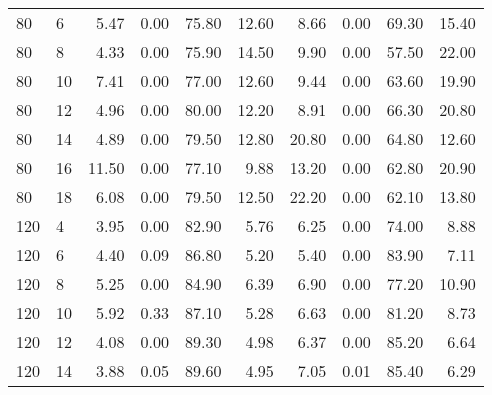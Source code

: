 \begin{table*}[h]
\begin{center}
\begin{tabular} {l l | r r r r | r r r r }
80   &             6   &  5.47   &            0.00             &               75.80  &  12.60  &  8.66   &            0.00             &               69.30  &  15.40  \\
80   &             8   &  4.33   &            0.00             &               75.90  &  14.50  &  9.90   &            0.00             &               57.50  &  22.00  \\
80   &             10  &  7.41   &            0.00             &               77.00  &  12.60  &  9.44   &            0.00             &               63.60  &  19.90  \\
80   &             12  &  4.96   &            0.00             &               80.00  &  12.20  &  8.91   &            0.00             &               66.30  &  20.80  \\
80   &             14  &  4.89   &            0.00             &               79.50  &  12.80  &  20.80  &            0.00             &               64.80  &  12.60  \\
80   &             16  &  11.50  &            0.00             &               77.10  &  9.88   &  13.20  &            0.00             &               62.80  &  20.90  \\
80   &             18  &  6.08   &            0.00             &               79.50  &  12.50  &  22.20  &            0.00             &               62.10  &  13.80  \\
120  &             4   &  3.95   &            0.00             &               82.90  &  5.76   &  6.25   &            0.00             &               74.00  &  8.88   \\
120  &             6   &  4.40   &            0.09             &               86.80  &  5.20   &  5.40   &            0.00             &               83.90  &  7.11   \\
120  &             8   &  5.25   &            0.00             &               84.90  &  6.39   &  6.90   &            0.00             &               77.20  &  10.90  \\
120  &             10  &  5.92   &            0.33             &               87.10  &  5.28   &  6.63   &            0.00             &               81.20  &  8.73   \\
120  &             12  &  4.08   &            0.00             &               89.30  &  4.98   &  6.37   &            0.00             &               85.20  &  6.64   \\
120  &             14  &  3.88   &            0.05             &               89.60  &  4.95   &  7.05   &            0.01             &               85.40  &  6.29   \\

\end{tabular}
\end{center}
\end{table*}
